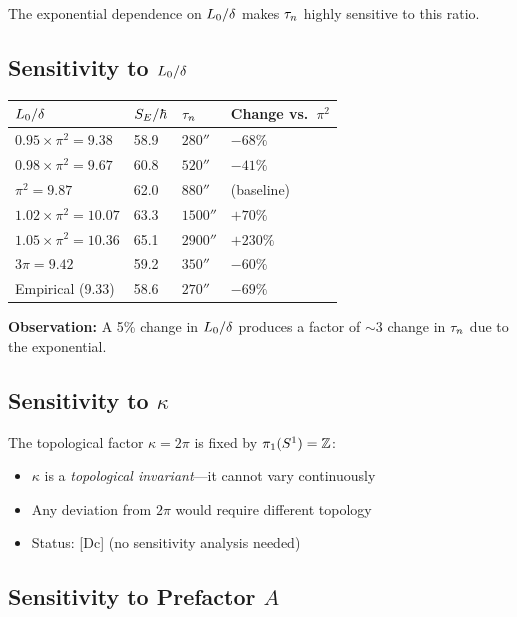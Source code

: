 The exponential dependence on $L_0/\delta$ makes $\tau_n$ highly sensitive
to this ratio.

\subsection{Sensitivity to $L_0/\delta$}

\begin{center}
\begin{tabular}{llll}
\toprule
$L_0/\delta$ & $S_E/\hbar$ & $\tau_n$ & Change vs.\ $\pi^2$ \\
\midrule
$0.95 \times \pi^2 = 9.38$ & 58.9 & $280\second$ & $-68\%$ \\
$0.98 \times \pi^2 = 9.67$ & 60.8 & $520\second$ & $-41\%$ \\
$\pi^2 = 9.87$ & 62.0 & $880\second$ & (baseline) \\
$1.02 \times \pi^2 = 10.07$ & 63.3 & $1500\second$ & $+70\%$ \\
$1.05 \times \pi^2 = 10.36$ & 65.1 & $2900\second$ & $+230\%$ \\
\midrule
$3\pi = 9.42$ & 59.2 & $350\second$ & $-60\%$ \\
Empirical (9.33) & 58.6 & $270\second$ & $-69\%$ \\
\bottomrule
\end{tabular}
\end{center}

\textbf{Observation:} A 5\% change in $L_0/\delta$ produces a factor of
$\sim 3$ change in $\tau_n$ due to the exponential.

\subsection{Sensitivity to $\kappa$}

The topological factor $\kappa = 2\pi$ is fixed by $\pi_1(S^1) = \mathbb{Z}$:
\begin{itemize}
    \item $\kappa$ is a \emph{topological invariant}---it cannot vary continuously
    \item Any deviation from $2\pi$ would require different topology
    \item Status: [Dc] (no sensitivity analysis needed)
\end{itemize}

\subsection{Sensitivity to Prefactor $A$}

